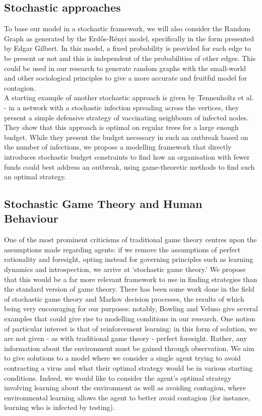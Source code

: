 \documentclass[hidelinks,a4paper,11pt]{article}
\numberwithin{equation}{section}
\begin{document}
\subsection{Stochastic approaches}

To base our model in a stochastic framework, we will also consider the Random Graph as generated by the Erd\H{o}s-R\'{e}nyi model, specifically in the form presented by Edgar Gilbert. In this model, a fixed probability is provided for each edge to be present or not and this is independent of the probabilities of other edges. \cite{gilbert59} This could be used in our research to generate random graphs with the small-world and other sociological principles to give a more accurate and fruitful model for contagion.\\

A starting example of another stochastic approach is given by Tennenholtz et al. - in a network with a stochastic infection spreading across the vertices, they present a simple defensive strategy of vaccinating neighbours of infected nodes. They show that this approach is optimal on regular trees for a large enough budget. \cite{tennenholtz17} While they present the budget necessary in such an outbreak based on the number of infections, we propose a modelling framework that directly introduces stochastic budget constraints to find how an organisation with fewer funds could best address an outbreak, using game-theoretic methods to find such an optimal strategy.\\

\subsection{Stochastic Game Theory and Human Behaviour}

One of the most prominent criticisms of traditional game theory centres upon the assumptions made regarding agents: if we remove the assumptions of perfect rationality and foresight, opting instead for governing principles such as learning dynamics and introspection, we arrive at `stochastic game theory.' \cite{goeree99} We propose that this would be a far more relevant framework to use in finding strategies than the standard version of game theory. There has been some work done in the field of stochastic game theory and Markov decision processes, the results of which being very encouraging for our purposes: notably, Bowling and Veluso give several examples that could give rise to modelling conditions in our research. \cite{bowling00} One notion of particular interest is that of reinforcement learning: in this form of solution, we are not given - as with traditional game theory - perfect foresight. Rather, any information about the environment must be gained through observation. We aim to give solutions to a model where we consider a single agent trying to avoid contracting a virus and what their optimal strategy would be in various starting conditions. Indeed, we would like to consider the agent's optimal strategy involving learning about the environment as well as avoiding contagion, where environmental learning allows the agent to better avoid contagion (for instance, learning who is infected by testing). \\
\end{document}
